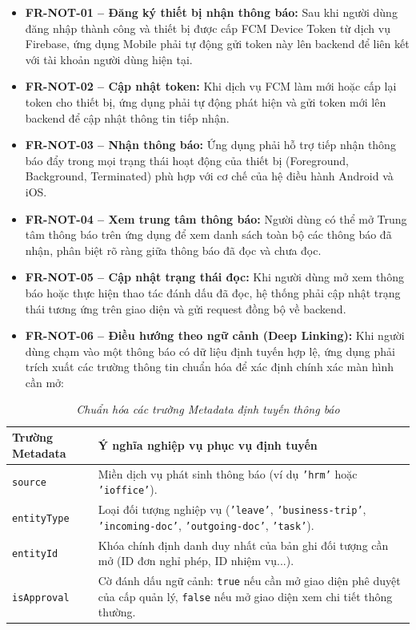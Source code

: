 \begin{itemize}[leftmargin=1.5cm]
    \item \textbf{FR-NOT-01 -- Đăng ký thiết bị nhận thông báo:} Sau khi người dùng đăng nhập thành công và thiết bị được cấp FCM Device Token từ dịch vụ Firebase, ứng dụng Mobile phải tự động gửi token này lên backend để liên kết với tài khoản người dùng hiện tại.
    
    \item \textbf{FR-NOT-02 -- Cập nhật token:} Khi dịch vụ FCM làm mới hoặc cấp lại token cho thiết bị, ứng dụng phải tự động phát hiện và gửi token mới lên backend để cập nhật thông tin tiếp nhận.
    
    \item \textbf{FR-NOT-03 -- Nhận thông báo:} Ứng dụng phải hỗ trợ tiếp nhận thông báo đẩy trong mọi trạng thái hoạt động của thiết bị (Foreground, Background, Terminated) phù hợp với cơ chế của hệ điều hành Android và iOS.
    
    \item \textbf{FR-NOT-04 -- Xem trung tâm thông báo:} Người dùng có thể mở Trung tâm thông báo trên ứng dụng để xem danh sách toàn bộ các thông báo đã nhận, phân biệt rõ ràng giữa thông báo đã đọc và chưa đọc.
    
    \item \textbf{FR-NOT-05 -- Cập nhật trạng thái đọc:} Khi người dùng mở xem thông báo hoặc thực hiện thao tác đánh dấu đã đọc, hệ thống phải cập nhật trạng thái tương ứng trên giao diện và gửi request đồng bộ về backend.
    
    \item \textbf{FR-NOT-06 -- Điều hướng theo ngữ cảnh (Deep Linking):} Khi người dùng chạm vào một thông báo có dữ liệu định tuyến hợp lệ, ứng dụng phải trích xuất các trường thông tin chuẩn hóa để xác định chính xác màn hình cần mở:
\end{itemize}

\begin{table}[H]
\centering
\renewcommand{\arraystretch}{1.25}
\begin{tabularx}{\textwidth}{|p{3.5cm}|X|}
\hline
\textbf{Trường Metadata} & \textbf{Ý nghĩa nghiệp vụ phục vụ định tuyến} \\
\hline
\texttt{source} & Miền dịch vụ phát sinh thông báo (ví dụ \texttt{'hrm'} hoặc \texttt{'ioffice'}). \\
\hline
\texttt{entityType} & Loại đối tượng nghiệp vụ (\texttt{'leave'}, \texttt{'business-trip'}, \texttt{'incoming-doc'}, \texttt{'outgoing-doc'}, \texttt{'task'}). \\
\hline
\texttt{entityId} & Khóa chính định danh duy nhất của bản ghi đối tượng cần mở (ID đơn nghỉ phép, ID nhiệm vụ...). \\
\hline
\texttt{isApproval} & Cờ đánh dấu ngữ cảnh: \texttt{true} nếu cần mở giao diện phê duyệt của cấp quản lý, \texttt{false} nếu mở giao diện xem chi tiết thông thường. \\
\hline
\end{tabularx}
\caption{\textit{Chuẩn hóa các trường Metadata định tuyến thông báo}}
\label{tab:notification_metadata}
\end{table}


